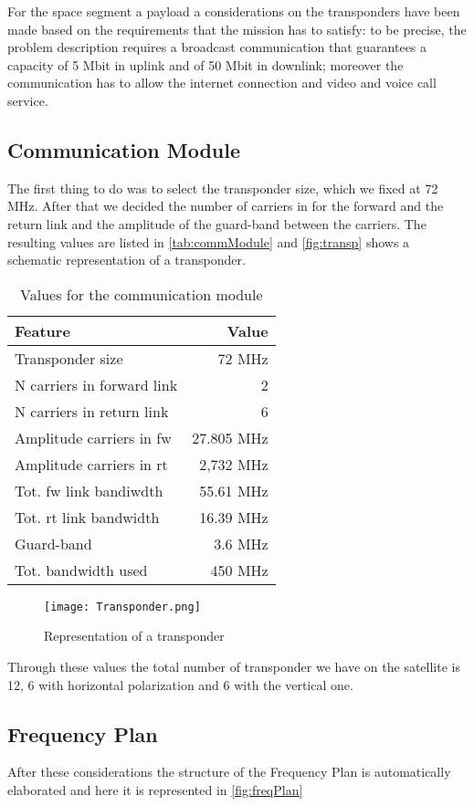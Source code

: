 For the space segment a payload a considerations on the transponders have been made based on the requirements that the mission has to satisfy: to be precise, the problem description requires a broadcast communication that guarantees a capacity of 5 Mbit in uplink and of 50 Mbit in downlink; moreover the communication has to allow the internet connection and video and voice call service.
\subsection{Communication Module}
The first thing to do was to select the transponder size, which we fixed at 72 MHz. After that we decided the number of carriers in for the forward and the return link and the amplitude of the guard-band between the carriers. The resulting values are listed in \autoref{tab:commModule} and \autoref{fig:transp} shows a schematic representation of a transponder.

\begin{table}
\centering
\begin{tabular}{lr}
\toprule
Feature & Value\\
\midrule
Transponder size & 72 MHz\\
N carriers in forward link & 2\\
N carriers in return link & 6\\
Amplitude carriers in fw & 27.805 MHz\\
Amplitude carriers in rt & 2,732 MHz\\
Tot. fw link bandiwdth & 55.61 MHz\\
Tot. rt link bandwidth & 16.39 MHz\\
Guard-band & 3.6 MHz\\
Tot. bandwidth used & 450 MHz\\
\bottomrule
\end{tabular}
\caption{Values for the communication module}
\label{tab:commModule}
\end{table}

\begin{figure}
\centering
\texttt{[image: Transponder.png]}
\caption{Representation of a transponder}
\label{fig:transp}
\end{figure}

Through these values the total number of transponder we have on the satellite is 12, 6 with horizontal polarization and 6 with the vertical one.

\subsection{Frequency Plan}
After these considerations the structure of the Frequency Plan is automatically elaborated and here it is represented in \autoref{fig:freqPlan}

